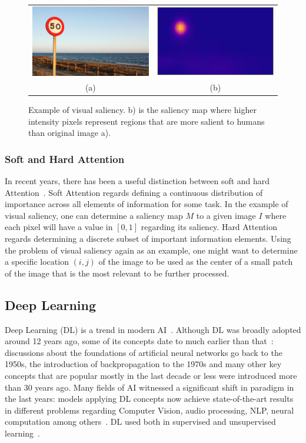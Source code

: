 \documentclass[12pt]{article}
\begin{document}
\begin{figure}
\begin{center}
        \begin{tabular} {cc}
        \includegraphics[width=0.35\linewidth]{./img/traffic_sign_s.jpg} &
        \includegraphics[width=0.35\linewidth]{./img/traffic_sign_m.jpg}\\
        (a) & (b)
        \end{tabular}
\caption{Example of visual saliency.
    b) is the saliency map where higher intensity pixels represent
    regions that are more salient to humans than original image a).}
\label{fig:saliency}
\end{center}
\end{figure}

\subsubsection{Soft and Hard Attention}
In recent years, there has been a useful distinction between
soft and hard Attention~\cite{ref:att-survey}.
Soft Attention regards defining a continuous distribution of importance
across all elements of information for some task.
In the example of visual saliency, one can determine a saliency map $M$
to a given image $I$ where each pixel will have a value in $[0, 1]$
regarding its saliency.
Hard Attention regards determining a discrete subset of
important information elements.
Using the problem of visual saliency again as an example,
one might want to determine a specific location $(i, j)$ of the image
to be used as the center of a small patch of the image that is the most
relevant to be further processed.

\subsection{Deep Learning}
Deep Learning (DL) is a trend in modern AI~\cite{ref:dl}.
Although DL was broadly adopted around 12 years ago,
some of its concepts date to much earlier than that~\cite{ref:dl}:
discussions about the foundations of artificial neural networks go back
to the 1950s, the introduction of backpropagation to the 1970s
and many other key concepts that are popular mostly in the last decade or less
were introduced more than 30 years ago.
Many fields of AI witnessed a significant shift in paradigm
in the last years: models applying DL concepts now achieve state-of-the-art results in different problems regarding Computer Vision,
audio processing, NLP, neural computation among others~\cite{ref:dl-book}.
DL used both in supervised and unsupervised learning~\cite{ref:dl}.
\end{document}
